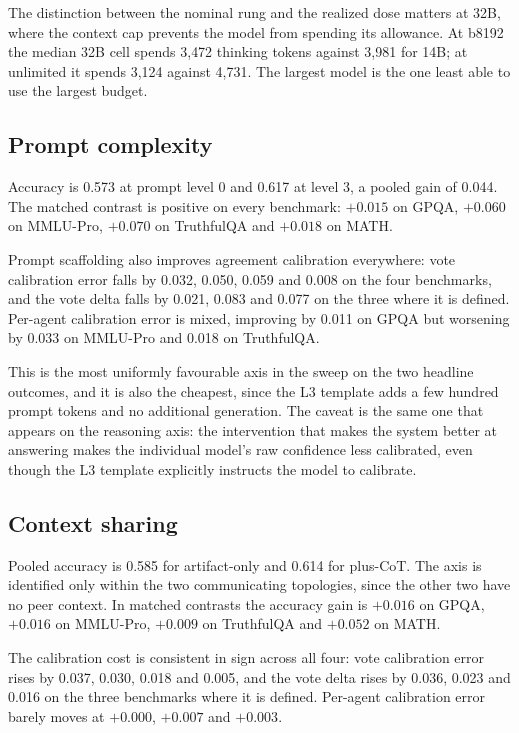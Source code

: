 The distinction between the nominal rung and the realized dose matters at 32B, where the
context cap prevents the model from spending its allowance. At b8192 the median 32B cell
spends 3{,}472 thinking tokens against 3{,}981 for 14B; at unlimited it spends 3{,}124
against 4{,}731. The largest model is the one least able to use the largest budget.

\subsection{Prompt complexity}

Accuracy is 0.573 at prompt level 0 and 0.617 at level 3, a pooled gain of 0.044. The
matched contrast is positive on every benchmark: $+0.015$ on GPQA, $+0.060$ on MMLU-Pro,
$+0.070$ on TruthfulQA and $+0.018$ on MATH.

Prompt scaffolding also improves agreement calibration everywhere: vote calibration error
falls by 0.032, 0.050, 0.059 and 0.008 on the four benchmarks, and the vote delta falls by
0.021, 0.083 and 0.077 on the three where it is defined. Per-agent calibration error is
mixed, improving by 0.011 on GPQA but worsening by 0.033 on MMLU-Pro and 0.018 on
TruthfulQA.

This is the most uniformly favourable axis in the sweep on the two headline outcomes, and
it is also the cheapest, since the L3 template adds a few hundred prompt tokens and no
additional generation. The caveat is the same one that appears on the reasoning axis: the
intervention that makes the system better at answering makes the individual model's raw
confidence less calibrated, even though the L3 template explicitly instructs the model to
calibrate.

\subsection{Context sharing}

Pooled accuracy is 0.585 for artifact-only and 0.614 for plus-CoT. The axis is identified
only within the two communicating topologies, since the other two have no peer context. In
matched contrasts the accuracy gain is $+0.016$ on GPQA, $+0.016$ on MMLU-Pro, $+0.009$ on
TruthfulQA and $+0.052$ on MATH.

The calibration cost is consistent in sign across all four: vote calibration error rises by
0.037, 0.030, 0.018 and 0.005, and the vote delta rises by 0.036, 0.023 and 0.016 on the
three benchmarks where it is defined. Per-agent calibration error barely moves at
$+0.000$, $+0.007$ and $+0.003$.

